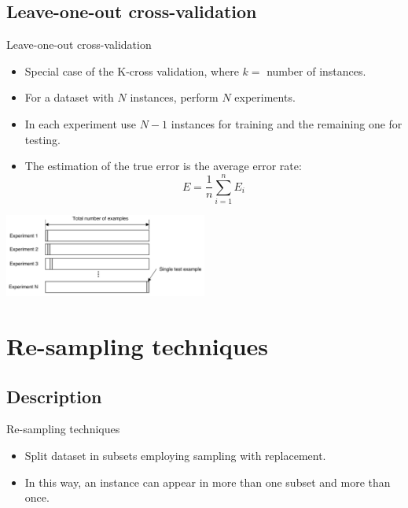 \documentclass[aspectratio=169,compress,10pt]{beamer}
\begin{document}
\subsection{Leave-one-out cross-validation}

\begin{frame}{Leave-one-out cross-validation}
\begin{itemize}
	\item Special case of the K-cross validation, where $k =$ number of instances.
	\item For a dataset with $N$ instances, perform $N$ experiments.
	\item In each experiment use $N-1$ instances for training and the remaining one for testing.
	\item The estimation of the true error is the average error rate:
$$
	E = \frac{1}{n} \sum_{i=1}^n E_{i}
$$
\end{itemize}
\centering{}
\includegraphics[width=0.5\textwidth]{../report/resources/images/leave-one-out}
\end{frame}


\section{Re-sampling techniques}
\subsection{Description}
\begin{frame}{Re-sampling techniques}
\begin{itemize}
	\item Split dataset in subsets employing sampling with replacement.
	\item In this way, an instance can appear in more than one subset and more than once.
\end{itemize}
\end{frame}
\end{document}
